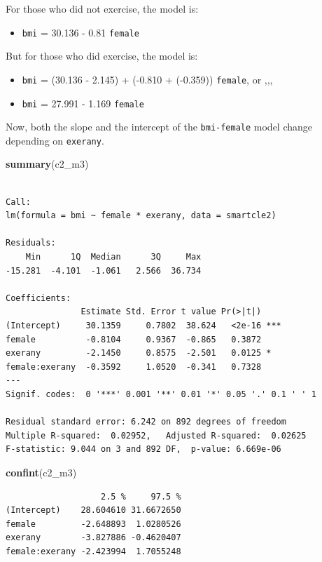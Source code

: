 \documentclass[]{book}
\newenvironment{Shaded}{\begin{snugshade}}{\end{snugshade}}
\newcommand{\KeywordTok}[1]{\textcolor[rgb]{0.13,0.29,0.53}{\textbf{#1}}}
\newcommand{\NormalTok}[1]{#1}
\providecommand{\tightlist}{%
  \setlength{\itemsep}{0pt}\setlength{\parskip}{0pt}}
\theoremstyle{definition}
\theoremstyle{definition}
\theoremstyle{definition}
\theoremstyle{remark}
\begin{document}
For those who did not exercise, the model is:

\begin{itemize}
\tightlist
\item
  \texttt{bmi} = 30.136 - 0.81 \texttt{female}
\end{itemize}

But for those who did exercise, the model is:

\begin{itemize}
\tightlist
\item
  \texttt{bmi} = (30.136 - 2.145) + (-0.810 + (-0.359)) \texttt{female},
  or ,,,
\item
  \texttt{bmi} = 27.991 - 1.169 \texttt{female}
\end{itemize}

Now, both the slope and the intercept of the \texttt{bmi-female} model
change depending on \texttt{exerany}.

\begin{Shaded}
\begin{Highlighting}[]
\KeywordTok{summary}\NormalTok{(c2_m3)}
\end{Highlighting}
\end{Shaded}

\begin{verbatim}

Call:
lm(formula = bmi ~ female * exerany, data = smartcle2)

Residuals:
    Min      1Q  Median      3Q     Max 
-15.281  -4.101  -1.061   2.566  36.734 

Coefficients:
               Estimate Std. Error t value Pr(>|t|)    
(Intercept)     30.1359     0.7802  38.624   <2e-16 ***
female          -0.8104     0.9367  -0.865   0.3872    
exerany         -2.1450     0.8575  -2.501   0.0125 *  
female:exerany  -0.3592     1.0520  -0.341   0.7328    
---
Signif. codes:  0 '***' 0.001 '**' 0.01 '*' 0.05 '.' 0.1 ' ' 1

Residual standard error: 6.242 on 892 degrees of freedom
Multiple R-squared:  0.02952,   Adjusted R-squared:  0.02625 
F-statistic: 9.044 on 3 and 892 DF,  p-value: 6.669e-06
\end{verbatim}

\begin{Shaded}
\begin{Highlighting}[]
\KeywordTok{confint}\NormalTok{(c2_m3)}
\end{Highlighting}
\end{Shaded}

\begin{verbatim}
                   2.5 %     97.5 %
(Intercept)    28.604610 31.6672650
female         -2.648893  1.0280526
exerany        -3.827886 -0.4620407
female:exerany -2.423994  1.7055248
\end{verbatim}
\end{document}
